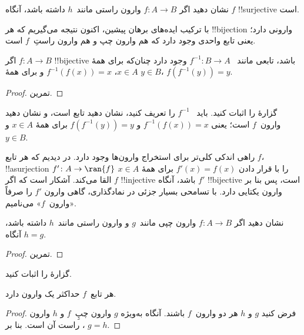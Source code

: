 \documentclass[../../../include/open-logic-section]{subfiles}
\begin{document}
\begin{prob}
نشان دهید اگر $f\colon A \to B$ وارون راستی مانند~$h$ داشته باشد، آنگاه $f$
!!{surjective} است.
\end{prob}

\begin{explain}
  با ترکیب ایده‌های برهان پیشین، اکنون نتیجه می‌گیریم که هر
  !!{bijection} وارونی دارد؛ یعنی تابع واحدی وجود دارد
  که هم وارون چپ و هم وارون راستِ~$f$ است.
\end{explain}

\begin{prop}
اگر $f\colon A \to B$ !!{bijective} باشد، تابعی مانند
~$f^{-1}\colon B \to A$ وجود دارد چنان‌که برای همهٔ $x \in A$،
$f^{-1}(f(x)) = x$ و برای همهٔ $y \in B$، $f(f^{-1}(y)) = y$.
\end{prop}

\begin{proof}
تمرین.
\end{proof}

\begin{prob}
گزارهٔ  را اثبات کنید. باید
~$f^{-1}$ را تعریف کنید، نشان دهید تابع است، و نشان دهید
وارون~$f$ است؛ یعنی $f^{-1}(f(x)) = x$ و $f(f^{-1}(y)) = y$ برای
همهٔ $x \in A$ و $y \in B$.
\end{prob}

\begin{explain}
راهی اندکی کلی‌تر برای استخراج وارون‌ها وجود دارد. در
 دیدیم که هر تابع $f$، !!a{surjection} $f'
\colon A \to \ran{f}$ را با قرار دادن $f'(x) = f(x)$ برای همهٔ $x \in A$ القا می‌کند.
آشکار است که اگر $f$ !!{injective} باشد، آنگاه $f'$ !!{bijective} است، پس
بنا بر  وارون یکتایی دارد. با تسامحی بسیار
جزئی در نمادگذاری، گاهی وارون $f'$ را صرفاً
«وارون~$f$» می‌نامیم.
\end{explain}

\begin{prop}%
  نشان دهید اگر $f\colon A \to B$ وارون چپی مانند~$g$ و وارون
  راستی مانند~$h$ داشته باشد، آنگاه $h = g$.
\end{prop}

\begin{proof}
  تمرین.
\end{proof}

\begin{prob}
  گزارهٔ  را اثبات کنید.
\end{prob}

\begin{prop}
هر تابع~$f$ حداکثر یک وارون دارد.
\end{prop}

\begin{proof}
  فرض کنید $g$ و $h$ هر دو وارون~$f$ باشند. آنگاه به‌ویژه
  $g$ وارون چپِ~$f$ و $h$ وارون راست آن است. بنا بر
  ، $g = h$.
\end{proof}
\end{document}
